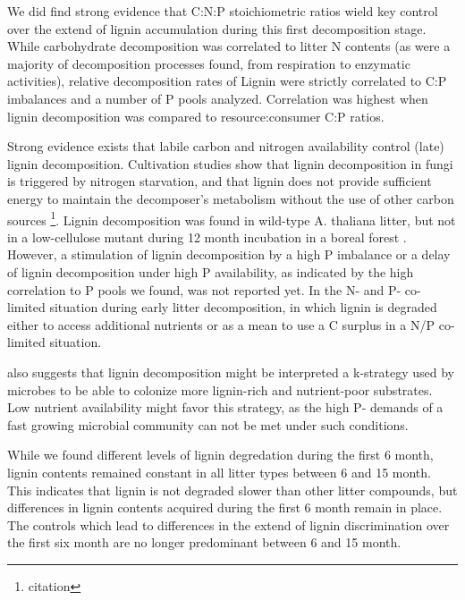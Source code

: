 \documentclass[authoryear,preprint,review,12pt]{elsarticle}
\begin{document}
We did find strong evidence that C:N:P stoichiometric ratios wield key control over the extend of lignin accumulation during this first decomposition stage. While carbohydrate decomposition was correlated to litter N contents (as were a majority of decomposition processes found, from respiration to enzymatic activities), relative decomposition rates of Lignin were strictly correlated to C:P imbalances and a number of P pools analyzed. Correlation was highest when lignin decomposition was compared to resource:consumer C:P ratios.


Strong evidence exists that labile carbon and nitrogen availability control (late) lignin decomposition. Cultivation studies show that lignin decomposition in fungi is triggered by nitrogen starvation, and that lignin does not provide sufficient energy to maintain the decomposer's metabolism without the use of other carbon sources \footnote{citation}. Lignin decomposition was found in wild-type A. thaliana litter, but not in a low-cellulose mutant during 12 month incubation in a boreal forest \citep{Talbot2011}. However, a stimulation of lignin decomposition by a high P imbalance or a delay of lignin decomposition under high P availability, as indicated by the high correlation to P pools we found, was not reported yet. In the N- and P- co-limited situation during early litter decomposition, in which lignin is degraded either to access additional nutrients or as a mean to use a C surplus in a N/P co-limited situation. 

\cite{Talbot2011} also suggests that lignin decomposition might be interpreted a k-strategy used by microbes to be able to colonize more lignin-rich and nutrient-poor substrates. Low nutrient availability might favor this strategy, as the high P- demands of a fast growing microbial community can not be met under such conditions.

While we found different levels of lignin degredation during the first 6 month, lignin contents remained constant in all litter types between 6 and 15 month. This indicates that lignin is not degraded slower than other litter compounds, but differences in lignin contents acquired during the first 6 month remain in place. The controls which lead to differences in the extend of lignin discrimination over the first six month are no longer predominant between 6 and 15 month. 
\end{document}
